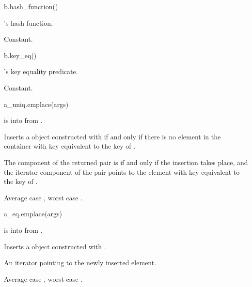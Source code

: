 %
\begin{itemdecl}
b.hash_function()
\end{itemdecl}

\begin{itemdescr}
\pnum
\result
{}

\pnum
\returns
{}'s hash function.

\pnum
\complexity
Constant.
\end{itemdescr}

%
\begin{itemdecl}
b.key_eq()
\end{itemdecl}

\begin{itemdescr}
\pnum
\result
{}

\pnum
\returns
{}'s key equality predicate.

\pnum
\complexity
Constant.
\end{itemdescr}

%
\begin{itemdecl}
a_uniq.emplace(args)
\end{itemdecl}

\begin{itemdescr}
\pnum
\result
{} 

\pnum
\expects
{} is
 into  from .

\pnum
\effects
Inserts a  object 
constructed with  if and only if
there is no element in the container
with key equivalent to the key of .

\pnum
\returns
The  component of the returned pair is 
if and only if the insertion takes place, and
the iterator component of the pair points to
the element with key equivalent to the key of .

\pnum
\complexity
Average case , worst case .
\end{itemdescr}

%
\begin{itemdecl}
a_eq.emplace(args)
\end{itemdecl}

\begin{itemdescr}
\pnum
\result
{}

\pnum
\expects
{} is
 into  from .

\pnum
\effects
Inserts a  object 
constructed with .

\pnum
\returns
An iterator pointing to the newly inserted element.

\pnum
\complexity
Average case , worst case .
\end{itemdescr}

